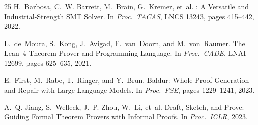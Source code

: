 \documentclass[11pt]{article}
\begin{document}
\begin{thebibliography}{25}
H.~Barbosa, C.~W. Barrett, M.~Brain, G.~Kremer, et~al.
: A Versatile and Industrial-Strength {SMT} Solver.
\newblock In \emph{Proc.\ TACAS}, LNCS 13243, pages 415--442, 2022.

L.~de~Moura, S.~Kong, J.~Avigad, F.~van~Doorn, and
  M.~von~Raumer.
\newblock The {Lean~4} Theorem Prover and Programming Language.
\newblock In \emph{Proc.\ CADE}, LNAI 12699, pages 625--635, 2021.

E.~First, M.~Rabe, T.~Ringer, and Y.~Brun.
\newblock Baldur: Whole-Proof Generation and Repair with Large
  Language Models.
\newblock In \emph{Proc.\ FSE}, pages 1229--1241, 2023.

A.~Q. Jiang, S.~Welleck, J.~P. Zhou, W.~Li, et~al.
\newblock Draft, Sketch, and Prove: Guiding Formal Theorem Provers
  with Informal Proofs.
\newblock In \emph{Proc.\ ICLR}, 2023.

\end{thebibliography}
\end{document}
